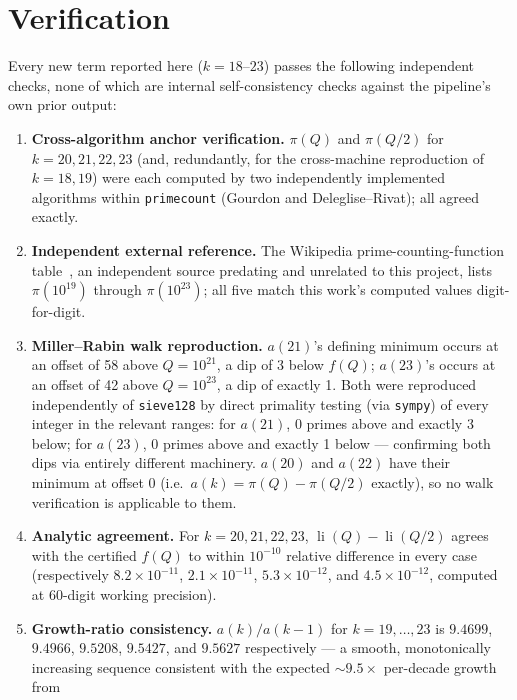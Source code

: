 \documentclass[11pt]{amsart}
\newcommand{\pcount}{\pi}
\newcommand{\li}{\operatorname{li}}
\begin{document}
\section{Verification}
\label{sec:verification}

Every new term reported here ($k=18$--$23$) passes the following
independent checks, none of which are internal self-consistency checks
against the pipeline's own prior output:

\begin{enumerate}
  \item \textbf{Cross-algorithm anchor verification.} $\pcount(Q)$ and
  $\pcount(Q/2)$ for $k=20,21,22,23$ (and, redundantly, for the
  cross-machine reproduction of $k=18,19$) were each computed by two
  independently implemented algorithms within \texttt{primecount}
  (Gourdon and Deleglise--Rivat); all agreed exactly.
  \item \textbf{Independent external reference.} The Wikipedia
  prime-counting-function table~\cite{wikipedia-picount}, an
  independent source predating and unrelated to this project, lists
  $\pcount(10^{19})$ through $\pcount(10^{23})$; all five match this
  work's computed values digit-for-digit.
  \item \textbf{Miller--Rabin walk reproduction.} $a(21)$'s defining
  minimum occurs at an offset of 58 above $Q=10^{21}$, a dip of 3 below
  $f(Q)$; $a(23)$'s occurs at an offset of 42 above $Q=10^{23}$, a dip of
  exactly 1. Both were reproduced independently of \texttt{sieve128} by
  direct primality testing (via \texttt{sympy}) of every integer in the
  relevant ranges: for $a(21)$, 0 primes above and exactly 3 below; for
  $a(23)$, 0 primes above and exactly 1 below --- confirming both dips
  via entirely different machinery. $a(20)$ and $a(22)$ have their
  minimum at offset 0 (i.e.\ $a(k) = \pcount(Q)-\pcount(Q/2)$ exactly),
  so no walk verification is applicable to them.
  \item \textbf{Analytic agreement.} For $k=20,21,22,23$,
  $\li(Q)-\li(Q/2)$ agrees with the certified $f(Q)$ to within
  $10^{-10}$ relative difference in every case (respectively
  $8.2\times10^{-11}$, $2.1\times10^{-11}$, $5.3\times10^{-12}$, and
  $4.5\times10^{-12}$, computed at 60-digit working precision).
  \item \textbf{Growth-ratio consistency.} $a(k)/a(k-1)$ for
  $k=19,\dots,23$ is $9.4699$, $9.4966$, $9.5208$, $9.5427$, and
  $9.5627$ respectively --- a smooth, monotonically increasing sequence
  consistent with the expected $\sim\!9.5\times$ per-decade growth from

\end{enumerate}
\end{document}
